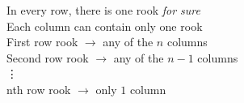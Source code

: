 \documentclass[preview]{standalone}
\begin{document}
\begin{center}
In every row, there is one rook \textit{for sure} \\ Each column can contain only one rook \\ First row rook $\rightarrow$ any of the $n$ columns \\ Second row rook $\rightarrow$ any of the $n - 1$ columns \\ \vdots \\ nth row rook $\rightarrow$ only $1$ column
\end{center}
\end{document}
